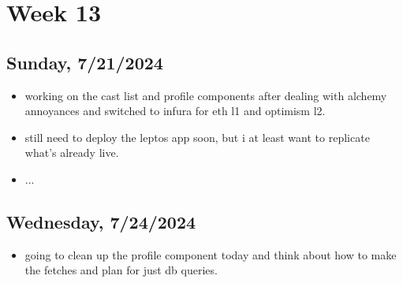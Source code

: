 \newpage
\section{Week 13}

\subsection*{Sunday, 7/21/2024}
\begin{itemize}
    \item working on the cast list and profile components after dealing with
        alchemy annoyances and switched to infura for eth l1 and optimism l2.
    \item still need to deploy the leptos app soon, but i at least want to
        replicate what's already live.
    \item ...
\end{itemize}

\subsection*{Wednesday, 7/24/2024}
\begin{itemize}
    \item going to clean up the profile component today and think about how to
        make the fetches and plan for just db queries.
\end{itemize}
